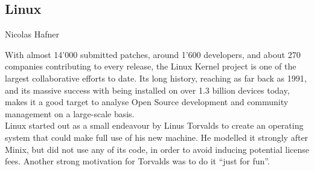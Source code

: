 \subsection{Linux}{Nicolas Hafner}

With almost 14'000 submitted patches, around 1'600 developers, and about 270 companies contributing to every release\cite{linux-whowrites}, the Linux Kernel project is one of the largest collaborative efforts to date. Its long history, reaching as far back as 1991\cite{linux-announce}, and its massive success with being installed on over 1.3 billion devices\cite{linux-usage} today, makes it a good target to analyse Open Source development and community management on a large-scale basis. \\

Linux started out as a small endeavour by Linus Torvalds to create an operating system that could make full use of his new machine. He modelled it strongly after Minix, but did not use any of its code, in order to avoid inducing potential license fees. Another strong motivation for Torvalds was to do it ``just for fun''.\cite{linus-biography,linux-history} \\

